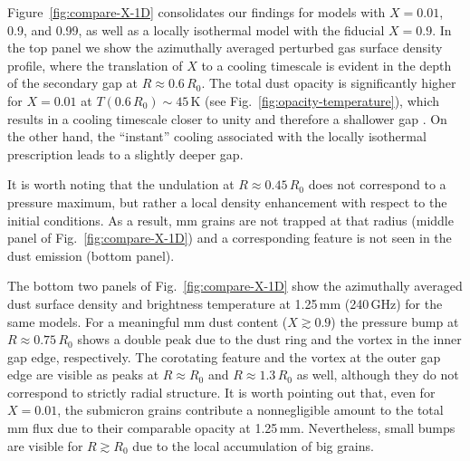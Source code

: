 \documentclass[fleqn,usenatbib,useAMS]{mnras}
\begin{document}
%
Figure~\ref{fig:compare-X-1D} consolidates our findings for models with $X=0.01$, 0.9, and 0.99, as well as a locally isothermal model with the fiducial $X=0.9$. In the top panel we show the azimuthally averaged perturbed gas surface density profile, where the translation of $X$ to a cooling timescale is evident in the depth of the secondary gap at $R\approx0.6\,R_0$. The total dust opacity is significantly higher for $X=0.01$ at $T(0.6\,R_0)\sim45$\,K (see Fig.~\ref{fig:opacity-temperature}), which results in a cooling timescale closer to unity and therefore a shallower gap \citep[e.g.,][]{zhang-zhu-2020}. On the other hand, the ``instant'' cooling associated with the locally isothermal prescription leads to a slightly deeper gap. 

It is worth noting that the undulation at $R\approx0.45\,R_0$ does not correspond to a pressure maximum, but rather a local density enhancement with respect to the initial conditions. As a result, mm grains are not trapped at that radius (middle panel of Fig.~\ref{fig:compare-X-1D}) and a corresponding feature is not seen in the dust emission (bottom panel).

The bottom two panels of Fig.~\ref{fig:compare-X-1D} show the azimuthally averaged dust surface density and brightness temperature at 1.25\,mm (240\,GHz) for the same models. For a meaningful mm dust content ($X\gtrsim0.9$) the pressure bump at $R\approx0.75\,R_0$ shows a double peak due to the dust ring and the vortex in the inner gap edge, respectively. The corotating feature and the vortex at the outer gap edge are visible as peaks at $R\approx R_0$ and $R\approx1.3\,R_0$ as well, although they do not correspond to strictly radial structure. It is worth pointing out that, even for $X=0.01$, the submicron grains contribute a nonnegligible amount to the total mm flux due to their comparable opacity at 1.25\,mm. Nevertheless, small bumps are visible for $R\gtrsim R_0$ due to the local accumulation of big grains.
\end{document}
